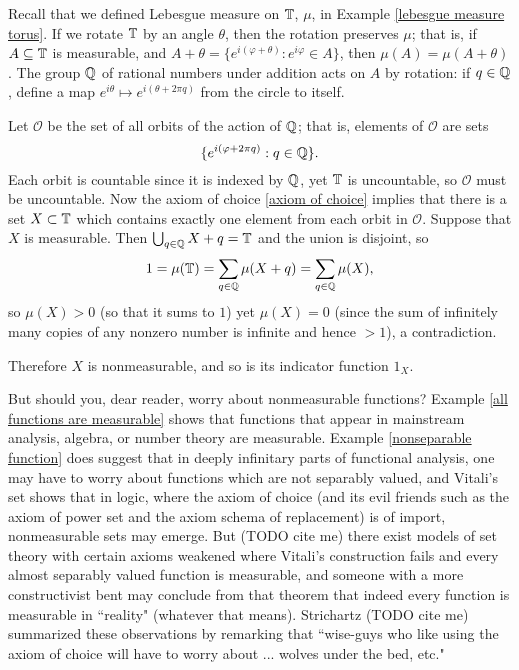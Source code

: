 \begin{example}
\label{Vitali set}
Recall that we defined Lebesgue measure on $\mathbb{T}$, $\mu$, in Example \ref{lebesgue measure torus}.
If we rotate $\mathbb{T}$ by an angle $\theta$, then the rotation preserves $\mu$; that is, if $A \subseteq \mathbb{T}$ is measurable, and $A + \theta = \{e^{i(\varphi+\theta)}: e^{i\varphi} \in A\}$, then $\mu(A) = \mu(A + \theta)$.
The group $\mathbb{Q}$ of rational numbers under addition acts on $A$ by rotation: if $q \in \mathbb{Q}$, define a map $e^{i\theta} \mapsto e^{i(\theta + 2\pi q)}$ from the circle to itself.

Let $\mathcal O$ be the set of all orbits of the action of $\mathbb{Q}$; that is, elements of $\mathcal O$ are sets
$$\{e^{i(\varphi+2\pi q)}: q \in \mathbb{Q}\}.$$
Each orbit is countable since it is indexed by $\mathbb{Q}$, yet $\mathbb{T}$ is uncountable, so $\mathcal O$ must be uncountable.
Now the axiom of choice \ref{axiom of choice} implies that there is a set $X \subset \mathbb{T}$ which contains exactly one element from each orbit in $\mathcal O$.
Suppose that $X$ is measurable. Then $\bigcup_{q \in \mathbb{Q}} X + q = \mathbb{T}$ and the union is disjoint, so
$$1 = \mu(\mathbb{T}) = \sum_{q \in \mathbb{Q}} \mu(X +  q) = \sum_{q \in \mathbb{Q}} \mu(X),$$
so $\mu(X) > 0$ (so that it sums to $1$) yet $\mu(X) = 0$ (since the sum of infinitely many copies of any nonzero number is infinite and hence $> 1$), a contradiction.

Therefore $X$ is nonmeasurable, and so is its indicator function $1_X$.
\end{example}

\begin{subsec}
But should you, dear reader, worry about nonmeasurable functions?
Example \ref{all functions are measurable} shows that functions that appear in mainstream analysis, algebra, or number theory are measurable.
Example \ref{nonseparable function} does suggest that in deeply infinitary parts of functional analysis, one may have to worry about functions which are not separably valued, and Vitali's set shows that in logic, where the axiom of choice (and its evil friends such as the axiom of power set and the axiom schema of replacement) is of import, nonmeasurable sets may emerge.
But (TODO cite me) there exist models of set theory with certain axioms weakened where Vitali's construction fails and every almost separably valued function is measurable, and someone with a more constructivist bent may conclude from that theorem that indeed every function is measurable in ``reality" (whatever that means).
Strichartz (TODO cite me) summarized these observations by remarking that ``wise-guys who like using the axiom of choice will have to worry about ... wolves under the bed, etc."
\end{subsec}

